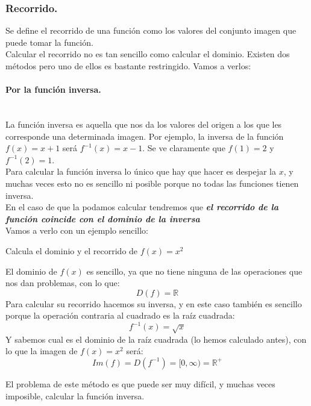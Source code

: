 \documentclass[a4paper,11pt,answers]{exam}
\begin{document}
\subsubsection{Recorrido.}
Se define el recorrido de una función como los valores del conjunto imagen que puede tomar la función.\\

Calcular el recorrido no es tan sencillo como calcular el dominio. Existen dos métodos pero uno de ellos es bastante restringido. Vamos a verlos:
\paragraph{Por la función inversa.}\mbox{}\\ %
La función inversa es aquella que nos da los valores del origen a los que les corresponde una determinada imagen. Por ejemplo, la inversa de la función $f(x) = x + 1$ será $f^{-1} (x)= x - 1$. Se ve claramente que $f(1) = 2$ y $f^{-1}(2) = 1$.\\

Para calcular la función inversa lo único que hay que hacer es despejar la $x$, y muchas veces esto no es sencillo ni posible porque no todas las funciones tienen inversa.\\

En el caso de que la podamos calcular tendremos que \textit{\textbf{el recorrido de la función coincide con el dominio de la inversa}}\\

Vamos a verlo con un ejemplo sencillo:
\begin{questions}
\question Calcula el dominio y el recorrido de $f(x) = x^2$
\begin{solution}
El dominio de $f(x)$ es sencillo, ya que no tiene ninguna de las operaciones que nos dan problemas, con lo que:
\[D(f) = \mathbb{R}\]
Para calcular su recorrido hacemos su inversa, y en este caso también es sencillo porque la operación contraria al cuadrado es la raíz cuadrada:
\[f^{-1}(x) = \sqrt{x}\]
Y sabemos cual es el dominio de la raíz cuadrada (lo hemos calculado antes), con lo que la imagen de $f(x) = x^2$ será:
\[Im(f) = D(f^{-1}) = [0, \infty) = \mathbb{R}^+\]
\end{solution}
\end{questions}

El problema de este método es que puede ser muy difícil, y muchas veces imposible, calcular la función inversa.
\end{document}
